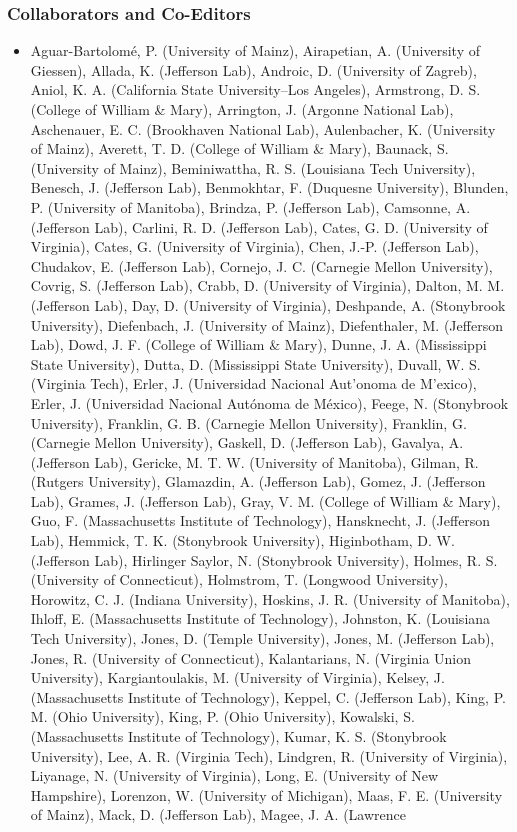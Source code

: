 \subsubsection*{Collaborators and Co-Editors}
\begin{itemize}
 \item Aguar-Bartolom\'e, P. (University of Mainz), Airapetian, A. (University of Giessen), Allada, K. (Jefferson Lab), Androic, D. (University of Zagreb), Aniol, K. A. (California State University--Los Angeles), Armstrong, D. S. (College of William \& Mary), Arrington, J. (Argonne National Lab), Aschenauer, E. C. (Brookhaven National Lab), Aulenbacher, K. (University of Mainz), Averett, T. D. (College of William \& Mary), Baunack, S. (University of Mainz), Beminiwattha, R. S. (Louisiana Tech University), Benesch, J. (Jefferson Lab), Benmokhtar, F. (Duquesne University), Blunden, P. (University of Manitoba), Brindza, P. (Jefferson Lab), Camsonne, A. (Jefferson Lab), Carlini, R. D. (Jefferson Lab), Cates, G. D. (University of Virginia), Cates, G. (University of Virginia), Chen, J.-P. (Jefferson Lab), Chudakov, E. (Jefferson Lab), Cornejo, J. C. (Carnegie Mellon University), Covrig, S. (Jefferson Lab), Crabb, D. (University of Virginia), Dalton, M. M. (Jefferson Lab), Day, D. (University of Virginia), Deshpande, A. (Stonybrook University), Diefenbach, J. (University of Mainz), Diefenthaler, M. (Jefferson Lab), Dowd, J. F. (College of William \& Mary), Dunne, J. A. (Mississippi State University), Dutta, D. (Mississippi State University), Duvall, W. S. (Virginia Tech), Erler, J. (Universidad Nacional Aut'onoma de M'exico), Erler, J. (Universidad Nacional Aut\'onoma de M\'exico), Feege, N. (Stonybrook University), Franklin, G. B. (Carnegie Mellon University), Franklin, G. (Carnegie Mellon University), Gaskell, D. (Jefferson Lab), Gavalya, A. (Jefferson Lab), Gericke, M. T. W. (University of Manitoba), Gilman, R. (Rutgers University), Glamazdin, A. (Jefferson Lab), Gomez, J. (Jefferson Lab), Grames, J. (Jefferson Lab), Gray, V. M. (College of William \& Mary), Guo, F. (Massachusetts Institute of Technology), Hansknecht, J. (Jefferson Lab), Hemmick, T. K. (Stonybrook University), Higinbotham, D. W. (Jefferson Lab), Hirlinger Saylor, N. (Stonybrook University), Holmes, R. S. (University of Connecticut), Holmstrom, T. (Longwood University), Horowitz, C. J. (Indiana University), Hoskins, J. R. (University of Manitoba), Ihloff, E. (Massachusetts Institute of Technology), Johnston, K. (Louisiana Tech University), Jones, D. (Temple University), Jones, M. (Jefferson Lab), Jones, R. (University of Connecticut), Kalantarians, N. (Virginia Union University), Kargiantoulakis, M. (University of Virginia), Kelsey, J. (Massachusetts Institute of Technology), Keppel, C. (Jefferson Lab), King, P. M. (Ohio University), King, P. (Ohio University), Kowalski, S. (Massachusetts Institute of Technology), Kumar, K. S. (Stonybrook University), Lee, A. R. (Virginia Tech), Lindgren, R. (University of Virginia), Liyanage, N. (University of Virginia), Long, E. (University of New Hampshire), Lorenzon, W. (University of Michigan), Maas, F. E. (University of Mainz), Mack, D. (Jefferson Lab), Magee, J. A. (Lawrence 
\end{itemize}
